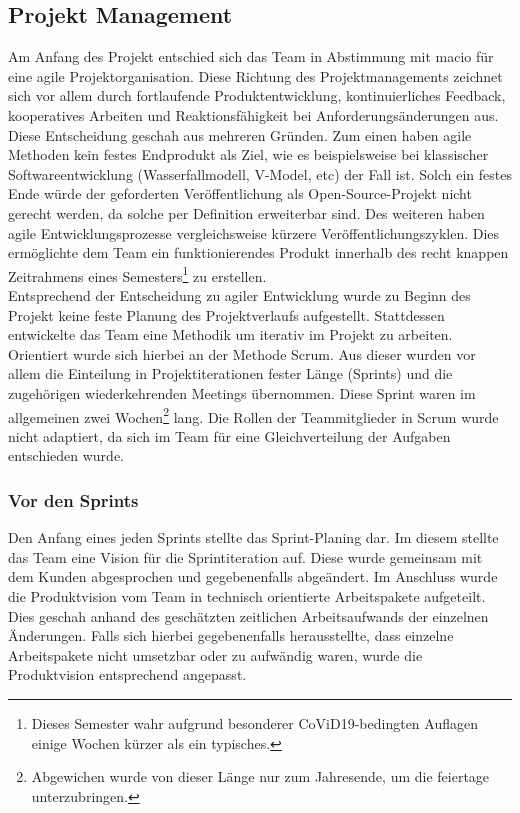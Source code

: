 \documentclass[10pt, a4paper, draft]{article}
\begin{document}
\subsection{Projekt Management}
Am Anfang des Projekt entschied sich das Team in Abstimmung mit macio für eine agile Projektorganisation.
Diese Richtung des Projektmanagements zeichnet sich vor allem durch fortlaufende Produktentwicklung, kontinuierliches Feedback, kooperatives Arbeiten und Reaktionsfähigkeit bei Anforderungsänderungen aus.
Diese Entscheidung geschah aus mehreren Gründen.
Zum einen haben agile Methoden kein festes Endprodukt als Ziel, wie es beispielsweise bei klassischer Softwareentwicklung (Wasserfallmodell, V-Model, etc) der Fall ist.
Solch ein festes Ende würde der geforderten Veröffentlichung als Open-Source-Projekt nicht gerecht werden, da solche per Definition erweiterbar sind.
Des weiteren haben agile Entwicklungsprozesse vergleichsweise kürzere Veröffentlichungszyklen.
Dies ermöglichte dem Team ein funktionierendes Produkt innerhalb des recht knappen Zeitrahmens eines Semesters\footnote{Dieses Semester wahr aufgrund besonderer CoViD19-bedingten Auflagen einige Wochen kürzer als ein typisches.} zu erstellen.
\\
Entsprechend der Entscheidung zu agiler Entwicklung wurde zu Beginn des Projekt keine feste Planung des Projektverlaufs aufgestellt.
Stattdessen entwickelte das Team eine Methodik um iterativ im Projekt zu arbeiten.
Orientiert wurde sich hierbei an der Methode Scrum.
Aus dieser wurden vor allem die Einteilung in Projektiterationen fester Länge (Sprints) und die zugehörigen wiederkehrenden Meetings übernommen.
Diese Sprint waren im allgemeinen zwei Wochen\footnote{Abgewichen wurde von dieser Länge nur zum Jahresende, um die feiertage unterzubringen.} lang.
Die Rollen der Teammitglieder in Scrum wurde nicht adaptiert, da sich im Team für eine Gleichverteilung der Aufgaben entschieden wurde.

\subsubsection{Vor den Sprints}
Den Anfang eines jeden Sprints stellte das Sprint-Planing dar.
Im diesem stellte das Team eine Vision für die Sprintiteration auf.
Diese wurde gemeinsam mit dem Kunden abgesprochen und gegebenenfalls abgeändert.
Im Anschluss wurde die Produktvision vom Team in technisch orientierte Arbeitspakete aufgeteilt.
Dies geschah anhand des geschätzten zeitlichen Arbeitsaufwands der einzelnen Änderungen.
Falls sich hierbei gegebenenfalls herausstellte, dass einzelne Arbeitspakete nicht umsetzbar oder zu aufwändig waren, wurde die Produktvision entsprechend angepasst.
\end{document}
